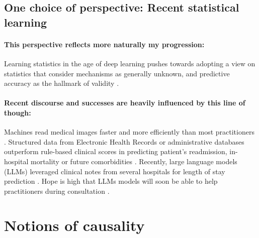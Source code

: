 \documentclass[french,12pt,twoside,a4paper]{book}
\begin{document}
\subsection{One choice of perspective: Recent statistical
  learning}\label{subsec:intro:recent_statistical_learning}
% 
\paragraph{This perspective reflects more naturally my progression:} Learning
statistics in the age of deep learning pushes towards adopting a view on
statistics that consider mechanisms as generally unknown, and predictive
accuracy as the hallmark of validity \citep{breiman2001statistical}.
% 
\paragraph{Recent discourse and successes are heavily influenced by this line of
  though:} Machines read medical images faster and more efficiently than most
practitioners \citep{zhou2021review}. Structured data from Electronic Health
Records \citep{rajkomar2018scalable} or administrative databases
\citep{beaulieu2021machine} outperform rule-based clinical scores in
predicting patient's readmission, in-hospital mortality or future
comorbidities \citep{li2020behrt}. Recently, large language models (LLMs)
leveraged clinical notes from several hospitals for length of stay prediction
\citep{jiang2023health}. Hope is high that LLMs models will soon be able to
help practitioners during consultation \citep{lee2023benefits}.


\section{Notions of causality}\label{sec:intro:causality}
\end{document}
